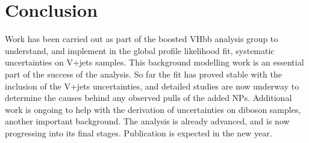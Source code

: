 \section{Conclusion}

Work has been carried out as part of the boosted VHbb analysis group to understand, and implement in the global profile likelihood fit, systematic uncertainties on V+jets samples. This background modelling work is an essential part of the success of the analysis. So far the fit has proved stable with the inclusion of the V+jets uncertainties, and detailed studies are now underway to determine the causes behind any observed pulls of the added NPs. Additional work is ongoing to help with the derivation of uncertainties on diboson samples, another important background. The analysis is already advanced, and is now progressing into its final stages. Publication is expected in the new year.